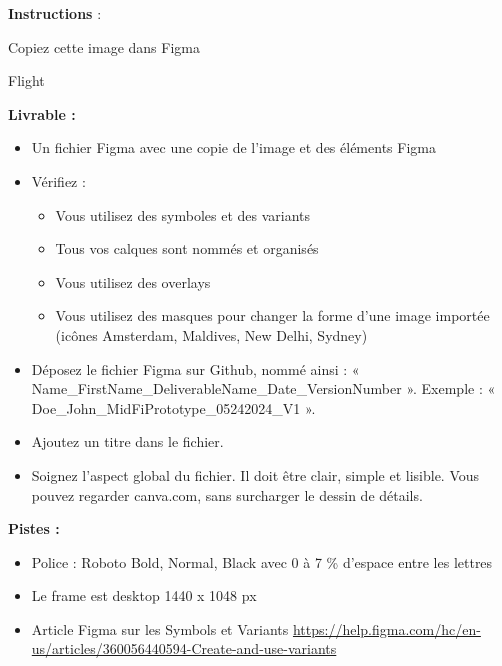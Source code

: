 \makeheaderfiles

\textbf{Instructions} :

Copiez cette image dans Figma

Flight

\textbf{Livrable :}

\begin{itemize}
\item Un fichier Figma avec une copie de l'image et des éléments Figma
\item Vérifiez :
\begin{itemize}
\item Vous utilisez des symboles et des variants
\item Tous vos calques sont nommés et organisés
\item Vous utilisez des overlays
\item Vous utilisez des masques pour changer la forme d'une image importée (icônes Amsterdam, Maldives, New Delhi, Sydney)
\end{itemize}
\item Déposez le fichier Figma sur Github, nommé ainsi : « Name\_FirstName\_DeliverableName\_Date\_VersionNumber ». Exemple : « Doe\_John\_MidFiPrototype\_05242024\_V1 ».
\item Ajoutez un titre dans le fichier.
\item Soignez l'aspect global du fichier. Il doit être clair, simple et lisible. Vous pouvez regarder canva.com, sans surcharger le dessin de détails.
\end{itemize}

\textbf{Pistes :}

\begin{itemize}
\item Police : Roboto Bold, Normal, Black avec 0 à 7 \% d'espace entre les lettres
\item Le frame est desktop 1440 x 1048 px
\item Article Figma sur les Symbols et Variants \url{https://help.figma.com/hc/en-us/articles/360056440594-Create-and-use-variants}
\end{itemize}

